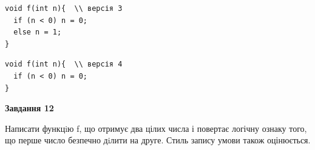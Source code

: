 \documentclass[12pt, ukrainian]{article}
\begin{document}
{\begin {large}
\begin{minipage}[t]{11.0cm}
\vspace{-8mm}\begin{verbatim}
void f(int n){  \\ версія 3
  if (n < 0) n = 0;
  else n = 1;
}
\end{verbatim}

\vspace{-8mm}\begin{verbatim}
void f(int n){  \\ версія 4
  if (n < 0) n = 0;
}
\end{verbatim}



\begin{center}
\textbf{Завдання 12}
\end{center}

Написати функцiю f, що отримує два цілих числа і повертає логічну ознаку того, що перше число безпечно дiлити на друге. Стиль запису умови також оцінюється.\par

\end{minipage}

\end {large}}
\newpage
\end{document}
